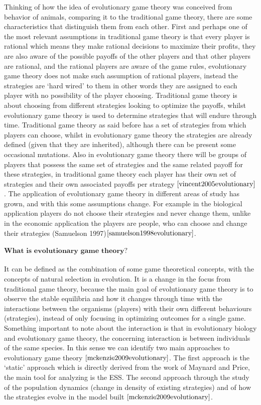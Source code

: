 Thinking of how the idea of evolutionary game theory was conceived from behavior of animals, comparing it to the traditional game theory, there are some characteristics that distinguish them from each other. First and perhaps one of the most relevant assumptions in traditional game theory is that every player is rational which means they make rational decisions to maximize their profits,  they are also aware of the possible payoffs of the other players and that other players are rational, and the rational players are aware of the game rules, evolutionary game theory does not make such assumption of rational players, instead the strategies are ‘hard wired’ to them in other words they are assigned to each player with no possibility of the player choosing.  Traditional game theory is about choosing from different strategies looking to optimize the payoffs, whilst evolutionary game theory is used to determine strategies that will endure through time. Traditional game theory as said before has a set of strategies from which players can choose, whilst in evolutionary game theory the strategies are already defined (given that they are inherited), although there can be present some occasional mutations. Also in evolutionary game theory there will be groups of players that possess the same set of strategies and the same related payoff for these strategies, in traditional game theory each player has their own set of strategies and their own associated payoffs per strategy $\cite{vincent2005evolutionary}$.  The application of evolutionary game theory in different areas of study has grown, and with this some assumptions change. For example in the biological application players do not choose their strategies and never change them, unlike in the economic application the players are people, who can choose and change their strategies (Samuelson 1997)$\cite{samuelson1998evolutionary}$.
\\\\$\textbf{What is evolutionary game theory?}$
\\\\It can be defined as the combination of some game theoretical concepts, with the concepts of natural selection in evolution. It is a change in the focus from traditional game theory, because the main goal of evolutionary game theory is to observe the stable equilibria and how it changes through time with the interactions between the organisms (players) with their own different behaviours (strategies), instead of only focusing in optimizing outcomes for a single game. Something important to note about the interaction is that in evolutionary biology and evolutionary game theory, the concerning interaction is between individuals of the same species. In this sense we can identify two main approaches to evolutionary game theory $\cite{mckenzie2009evolutionary}$. The first approach is the ‘static’ approach which is directly derived from the work of Maynard and Price, the main tool for analyzing is the ESS. The second approach through the study of the population dynamics (change in density of existing strategies) and of how the strategies evolve in the model built $\cite{mckenzie2009evolutionary}$.

